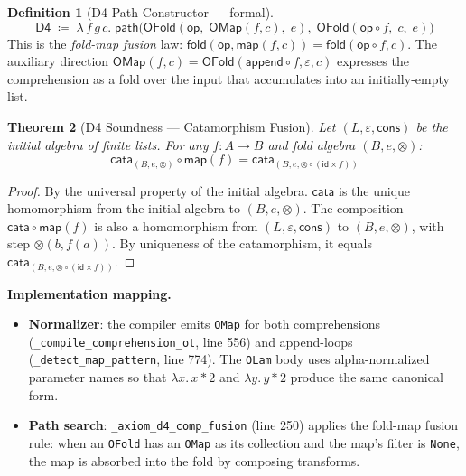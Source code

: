 \documentclass[11pt,a4paper]{report}
\theoremstyle{definition}
\newtheorem{definition}{Definition}[chapter]
\theoremstyle{plain}
\newtheorem{theorem}[definition]{Theorem}
\newcommand{\fold}{\mathsf{fold}}
\newcommand{\cata}{\mathsf{cata}}
\begin{document}
\begin{definition}[D4 Path Constructor --- formal]
\label{def:d4-path}
\[
  \mathsf{D4} \;\coloneqq\; \lambda\, f\, g\, c.\;
  \mathsf{path}\!\big(
    \mathsf{OFold}(\mathsf{op},\;
      \mathsf{OMap}(f, c),\; e),\;
    \mathsf{OFold}(\mathsf{op} \circ f,\; c,\; e)
  \big)
\]
This is the \emph{fold-map fusion} law:
$\fold(\mathsf{op}, \mathsf{map}(f, c)) = \fold(\mathsf{op} \circ f, c)$.
The auxiliary direction
$\mathsf{OMap}(f, c) = \mathsf{OFold}(\mathsf{append} \circ f,
\varepsilon, c)$ expresses the comprehension as a fold over the
input that accumulates into an initially-empty list.
\end{definition}

\begin{theorem}[D4 Soundness --- Catamorphism Fusion]
\label{thm:d4-sound}
Let $(L, \varepsilon, \mathsf{cons})$ be the initial algebra of
finite lists.  For any $f : A \to B$ and fold algebra
$(B, e, \otimes)$:
\[
  \cata_{(B,e,\otimes)} \circ \mathsf{map}(f)
  = \cata_{(B,e,\otimes \circ (\mathsf{id} \times f))}
\]
\end{theorem}

\begin{proof}
By the universal property of the initial algebra.
$\cata$ is the unique homomorphism from the initial algebra to
$(B, e, \otimes)$.  The composition $\cata \circ \mathsf{map}(f)$
is also a homomorphism from $(L, \varepsilon, \mathsf{cons})$ to
$(B, e, \otimes)$, with step $\otimes(b, f(a))$.
By uniqueness of the catamorphism, it equals
$\cata_{(B, e, \otimes \circ (\mathsf{id} \times f))}$.
\end{proof}

\textbf{Implementation mapping.}
\begin{itemize}
  \item \textbf{Normalizer}: the compiler emits \texttt{OMap} for
    both comprehensions (\texttt{\_compile\_comprehension\_ot},
    line 556) and append-loops (\texttt{\_detect\_map\_pattern},
    line 774).  The \texttt{OLam} body uses alpha-normalized
    parameter names so that $\lambda x.\,x*2$ and
    $\lambda y.\,y*2$ produce the same canonical form.
  \item \textbf{Path search}: \texttt{\_axiom\_d4\_comp\_fusion}
    (line 250) applies the fold-map fusion rule:
    when an \texttt{OFold} has an \texttt{OMap} as its collection
    and the map's filter is \texttt{None}, the map is absorbed into
    the fold by composing transforms.
\end{itemize}
\end{document}

